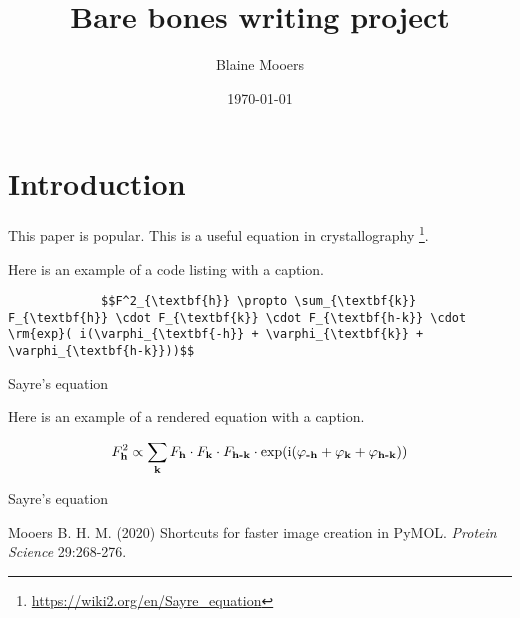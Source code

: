 \documentclass{article}
\title{\vspace {-2cm}Bare bones writing project}
\author{Blaine Mooers}
\date{\today}
\newenvironment{code}{\captionsetup{type=listing}}{}
\begin{document}
\maketitle

\section{Introduction}

This paper is popular\cite{Mooers2020ShortcutsForFasterImageCreationInPyMOL}. This is a useful equation in crystallography \footnote{\url{https://wiki2.org/en/Sayre_equation}}.

Here is an example of a code listing with a caption.

\begin{code}{}
    \begin{verbatim}
             $$F^2_{\textbf{h}} \propto \sum_{\textbf{k}} F_{\textbf{h}} \cdot F_{\textbf{k}} \cdot F_{\textbf{h-k}} \cdot \rm{exp}( i(\varphi_{\textbf{-h}} + \varphi_{\textbf{k}} + \varphi_{\textbf{h-k}}))$$
    \end{verbatim}
    \caption{Sayre's equation}
\end{code}

Here is an example of a rendered equation with a caption.

\begin{myequation}
      $$F^2_{\textbf{h}} \propto \sum_{\textbf{k}} F_{\textbf{h}} \cdot F_{\textbf{k}} \cdot F_{\textbf{h-k}} \cdot \rm{exp}( i(\varphi_{\textbf{-h}} + \varphi_{\textbf{k}} + \varphi_{\textbf{h-k}}) ) $$
    \caption{Sayre's equation}
\end{myequation}
    





\newpage

\begin{thebibliography}{99}
\newblock Mooers B. H. M.
\newblock (2020) 
\newblock Shortcuts for faster image creation in PyMOL. 
\newblock \emph{Protein Science} 29:268-276.
\end{thebibliography}
\end{document}
